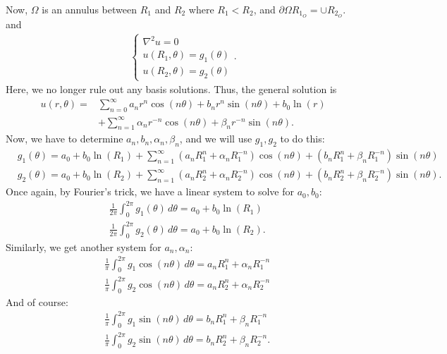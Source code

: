 \documentclass{article}
\theoremstyle{definition}
\newcommand{\p}{\partial}
\newcommand{\f}[2]{\frac{#1}{#2}}
\begin{document}
Now, $\Omega$ is an annulus between $R_1 $ and $R_2$ where $R_1 < R_2$, and $\p \Omega R_{1_{O}} =   \cup R_{2_{O}}$. and  
\begin{align*}
\begin{cases}
\nabla^2 u = 0\\
u(R_1,\theta) = g_1(\theta)\\
u(R_2,\theta) = g_2(\theta)
\end{cases}.
\end{align*}
Here, we no longer rule out any basis solutions. Thus, the general solution is
\begin{align*}
u(r,\theta) =& \sum^\infty_{n=0} a_n r^n \cos(n\theta) + b_n r^{n}\sin(n\theta) + b_0\ln(r) \\
&+\sum^\infty_{n=1}\alpha_n r^{-n}\cos(n\theta) + \beta_n r^{-n}\sin(n\theta). 
\end{align*}
Now, we have to determine $a_n, b_n, \alpha_n, \beta_n$, and we will use $g_1, g_2$ to do this: 
\begin{align*}
&g_1(\theta) = a_0 + b_0\ln(R_1) + \sum^\infty_{n=1}(a_n R_1^n + \alpha_n R_1^{-n})\cos(n\theta) + (b_n R_1^n + \beta_n R_1^{-n})\sin(n\theta)\\
&g_2(\theta) = a_0 + b_0\ln(R_2) + \sum^\infty_{n=1}(a_n R_2^n + \alpha_n R_2^{-n})\cos(n\theta) + (b_n R_2^n + \beta_n R_2^{-n})\sin(n\theta).
\end{align*}
Once again, by Fourier's trick, we have a linear system to solve for $a_0, b_0$:
\begin{align*}
&\f{1}{2\pi}\int^{2\pi}_0g_1(\theta)\,d\theta = a_0 + b_0 \ln(R_1)\\
&\f{1}{2\pi}\int^{2\pi}_0g_2(\theta)\,d\theta = a_0 + b_0 \ln(R_2).
\end{align*}
Similarly, we get another system for $a_n, \alpha_n$:
\begin{align*}
&\f{1}{\pi}\int^{2\pi}_0 g_1\cos(n\theta)\,d\theta = a_n R_1^n + \alpha_n R_1^{-n}\\
&\f{1}{\pi}\int^{2\pi}_0 g_2\cos(n\theta)\,d\theta = a_n R_2^n + \alpha_n R_2^{-n}
\end{align*}
And of course:
\begin{align*}
&\f{1}{\pi}\int^{2\pi}_0 g_1\sin(n\theta)\,d\theta = b_n R_1^n + \beta_n R_1^{-n}\\
&\f{1}{\pi}\int^{2\pi}_0 g_2\sin(n\theta)\,d\theta = b_n R_2^n + \beta_n R_2^{-n}.
\end{align*}
\end{document}
